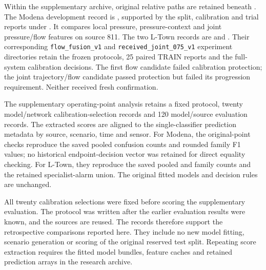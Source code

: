 Within the supplementary archive, original relative paths are retained beneath . The Modena development record is , supported by the split, calibration and trial reports under . It compares local pressure, pressure-context and joint pressure/flow features on source 811. The two L-Town records are  and . Their corresponding \texttt{flow\_fusion\_v1} and \texttt{received\_joint\_075\_v1} experiment directories retain the frozen protocols, 25 paired TRAIN reports and the full-system calibration decisions. The first flow candidate failed calibration protection; the joint trajectory/flow candidate passed protection but failed its progression requirement. Neither received fresh confirmation.

The supplementary operating-point analysis retains a fixed protocol, twenty model/network calibration-selection records and 120 model/source evaluation records. The extracted scores are aligned to the single-classifier prediction metadata by source, scenario, time and sensor. For Modena, the original-point checks reproduce the saved pooled confusion counts and rounded family F1 values; no historical endpoint-decision vector was retained for direct equality checking. For L-Town, they reproduce the saved pooled and family counts and the retained specialist-alarm union. The original fitted models and decision rules are unchanged.

All twenty calibration selections were fixed before scoring the supplementary evaluation. The protocol was written after the earlier evaluation results were known, and the sources are reused. The records therefore support the retrospective comparisons reported here. They include no new model fitting, scenario generation or scoring of the original reserved test split. Repeating score extraction requires the fitted model bundles, feature caches and retained prediction arrays in the research archive.


